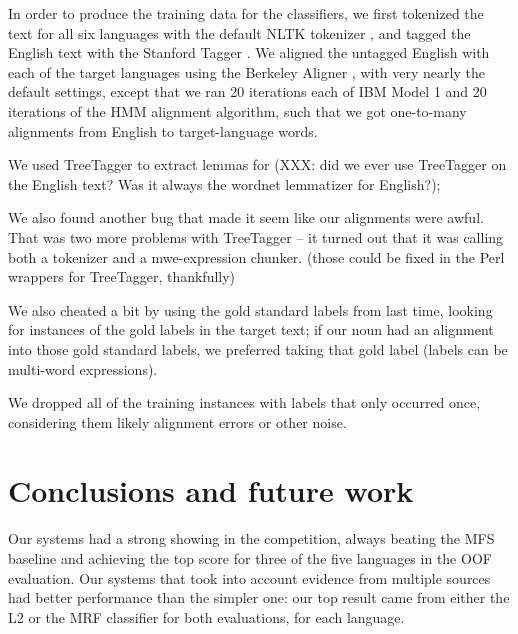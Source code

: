 \documentclass[11pt,letterpaper]{article}
\begin{document}
In order to produce the training data for the classifiers, we first tokenized
the text for all six languages with the default NLTK tokenizer \cite{nltkbook},
and tagged the English text with the Stanford Tagger
\cite{Toutanova03feature-richpart-of-speech}. We aligned the untagged English
with each of the target languages using the Berkeley Aligner
\cite{denero-klein:2007:ACLMain}, with very nearly the default settings, except
that we ran 20 iterations each of IBM Model 1 and 20 iterations of the HMM
alignment algorithm, such that we got one-to-many alignments from English to
target-language words.

We used TreeTagger to extract lemmas for \cite{Schmid95improvementsin}
(XXX: did we ever use TreeTagger on the English text? Was it always the wordnet
lemmatizer for English?);

We also found another bug that made it seem like our alignments were awful.
That was two more problems with TreeTagger -- it turned out that it was calling
both a tokenizer and a mwe-expression chunker. (those could be fixed in the
Perl wrappers for TreeTagger, thankfully)

We also cheated a bit by using the gold standard labels from last time, looking
for instances of the gold labels in the target text; if our noun had an
alignment into those gold standard labels, we preferred taking that gold label
(labels can be multi-word expressions).

We dropped all of the training instances with labels that only occurred once,
considering them likely alignment errors or other noise.

\section{Conclusions and future work}
Our systems had a strong showing in the competition, always beating the MFS
baseline and achieving the top score for three of the five languages in the OOF
evaluation. Our systems that took into account evidence from multiple sources
had better performance than the simpler one: our top result came from either
the L2 or the MRF classifier for both evaluations, for each language.
\end{document}
